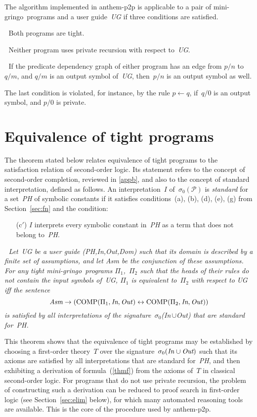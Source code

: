 \documentclass{tlp}
\def\ar{\leftarrow}
\def\lrar{\leftrightarrow}
\def\beq{\begin{equation}}
\def\eeq#1{\label{#1}\end{equation}}
\def\gringo{{\sc gringo}}
\newcommand{\PP}{\mathcal{P}}
\begin{document}
The algorithm implemented in {\sc anthem-p2p} is applicable to a pair
of mini-\gringo\ programs and a user guide~\emph{UG} if three
conditions are satisfied.

\medskip{}$\;$ Both programs are tight.

\medskip{}$\;$ Neither program uses private recursion
with respect to~\emph{UG}.

\medskip{}$\;$ If the predicate dependency graph of
either program has an edge from $p/n$ to $q/m$, and $q/m$ is an output symbol
of~\emph{UG}, then~$p/n$ is an output symbol as well.

\medskip
The last condition is violated, for instance, by the rule $p\ar q$,
if~$q/0$ is an output symbol, and $p/0$ is private.

\section{Equivalence of tight programs}\label{sec:tight}

The theorem stated below relates equivalence of tight programs to the
satisfaction relation of second-order logic.  Its statement refers to
the concept of second-order completion, reviewed in \ref{appb},
and also to the concept of  standard interpretation, defined as follows.
An interpretation~$I$ of~$\sigma_0(\PP)$ is \emph{standard} for a
set~\emph{PH} of symbolic constants if it
satisfies conditions~(a), (b), (d), (e), (g)
from Section~\ref{sec:fn} and the condition:
\begin{itemize}
\item[(c$'$)] $I$ interprets every symbolic constant in~\emph{PH}
  as a term that does not belong to~\emph{PH}.
\end{itemize}

\medskip{}$\;$\emph{
  Let~UG be a user guide (PH,In,Out,Dom) such that its domain is described by
  a finite set of assumptions, and let Asm be the conjunction of these
  assumptions.
  For any tight mini-\gringo\ programs $\Pi_1$,~$\Pi_2$ such that the
  heads of their rules do not contain the input symbols of~UG,
$\Pi_1$ is equivalent to~$\Pi_2$ with respect to UG iff the sentence}
\beq
\emph{Asm}\to(\hbox{COMP}(\Pi_1,\emph{In},\emph{Out\/}) \lrar
\hbox{COMP}(\Pi_2,\emph{In},\emph{Out\/}))
\eeq{thmf}
\emph{is satisfied by all interpretations of the
  signature~$\sigma_0$(In\,$\cup$Out) that are standard for~PH.}
\medskip

This theorem shows that the equivalence of tight programs may be established
by choosing a first-order theory~$T$ over the
signature~$\sigma_0(\emph{In\/}\cup\emph{Out})$ such that its axioms are
satisfied by all interpretations that are
standard for~\emph{PH}, and then exhibiting a derivation of
formula~(\ref{thmf}) from the axioms of~$T$ in classical second-order logic.
For programs that do not use private recursion, the problem of constructing
such a derivation can be reduced to proof search in first-order logic
(see Section~\ref{sec:elim}
below), for which many automated reasoning tools are available.
This is the core of the procedure used by {\sc anthem-p2p}.
\end{document}

